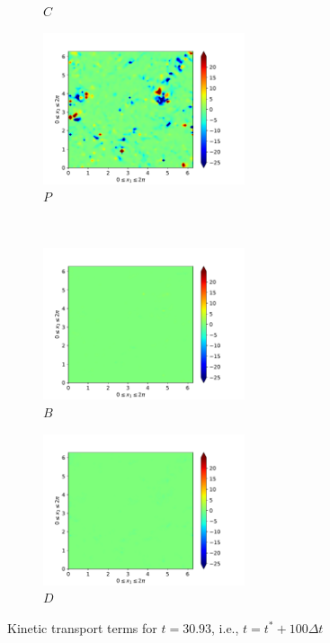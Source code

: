 \begin{figure}[H]
\begin{subfigure}{0.45\textwidth}
        \caption{$C$}
    \end{subfigure}
    \newline
    \begin{subfigure}{0.45\textwidth}
        \includegraphics[height=1.75in]{media/run-cds-65/P-ke-1440}
        \caption{$P$}
    \end{subfigure}
    ~
    \begin{subfigure}{0.45\textwidth}
        \includegraphics[height=1.75in]{media/run-cds-65/B-ke-1440}
        \caption{$B$}
    \end{subfigure}
    \newline
    \begin{subfigure}{0.45\textwidth}
        \includegraphics[height=1.75in]{media/run-cds-65/D-ke-1440}
        \caption{$D$}
    \end{subfigure}
    \caption{Kinetic transport terms for $t=30.93$, i.e., $t=t^{\ast} + 100 \Delta t$}
\end{figure}
